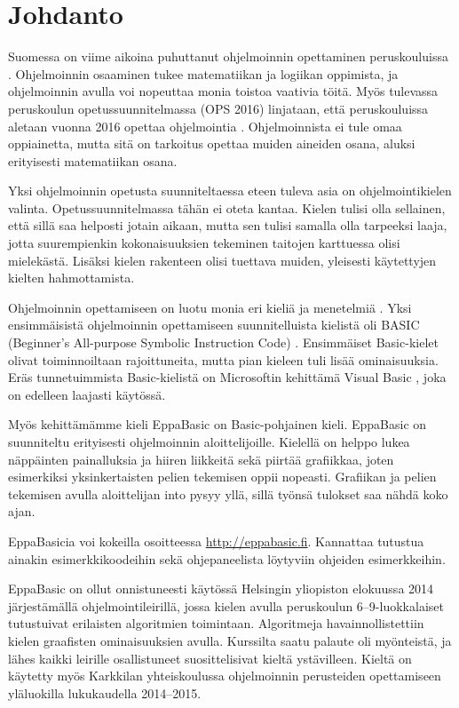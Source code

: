 
\section{Johdanto}
Suomessa on viime aikoina
puhuttanut ohjelmoinnin
opettaminen peruskouluissa
\cite{hs_kiuru}\cite{hs_eka}.
Ohjelmoinnin osaaminen
tukee matematiikan ja logiikan
oppimista, ja ohjelmoinnin
avulla voi nopeuttaa monia
toistoa vaativia töitä.
Myös tulevassa peruskoulun
opetussuunnitelmassa (OPS 2016)
linjataan, että peruskouluissa aletaan
vuonna 2016 opettaa ohjelmointia
\cite{OPS_2016}.
Ohjelmoinnista ei tule omaa oppiainetta,
mutta sitä on tarkoitus opettaa muiden
aineiden osana, aluksi erityisesti
matematiikan osana.

Yksi ohjelmoinnin opetusta suunniteltaessa eteen tuleva
asia on ohjelmointikielen valinta.
Opetussuunnitelmassa tähän ei
oteta kantaa.
Kielen tulisi olla sellainen,
että sillä saa helposti jotain aikaan,
mutta sen tulisi samalla olla tarpeeksi laaja,
jotta suurempienkin kokonaisuuksien tekeminen
taitojen karttuessa olisi mielekästä.
Lisäksi kielen rakenteen olisi tuettava muiden,
yleisesti käytettyjen kielten hahmottamista.

Ohjelmoinnin opettamiseen
on luotu monia eri kieliä ja menetelmiä
\cite{language_history}.
Yksi ensimmäisistä ohjelmoinnin opettamiseen
suunnitelluista kielistä oli BASIC
(Beginner's All-purpose Symbolic Instruction Code)
\cite{basic}.
Ensimmäiset Basic-kielet olivat toiminnoiltaan rajoittuneita,
mutta pian kieleen tuli lisää ominaisuuksia.
Eräs tunnetuimmista Basic-kielistä on
Microsoftin kehittämä Visual Basic
\cite{vb.net},
joka on edelleen laajasti käytössä.

Myös kehittämämme kieli EppaBasic
on Basic-pohjainen kieli.
EppaBasic on suunniteltu
erityisesti ohjelmoinnin aloittelijoille.
Kielellä on helppo lukea
näppäinten painalluksia
ja hiiren liikkeitä
sekä piirtää grafiikkaa,
joten esimerkiksi yksinkertaisten
pelien tekemisen oppii nopeasti.
Grafiikan ja pelien tekemisen avulla
aloittelijan into pysyy yllä,
sillä työnsä tulokset saa nähdä koko ajan.

EppaBasicia voi kokeilla osoitteessa
\url{http://eppabasic.fi}.
Kannattaa tutustua ainakin esimerkkikoodeihin
sekä ohjepaneelista löytyviin
ohjeiden esimerkkeihin.

EppaBasic on ollut onnistuneesti käytössä
Helsingin yliopiston elokuussa 2014
järjestämällä ohjelmointileirillä,
jossa kielen avulla peruskoulun
6--9-luokkalaiset
tutustuivat erilaisten algoritmien toimintaan.
Algoritmeja havainnollistettiin kielen
graafisten ominaisuuksien avulla.
Kurssilta saatu palaute oli myönteistä,
ja lähes kaikki leirille osallistuneet
suosittelisivat kieltä ystävilleen.
Kieltä on käytetty myös Karkkilan yhteiskoulussa
ohjelmoinnin perusteiden opettamiseen yläluokilla
lukukaudella 2014--2015.

